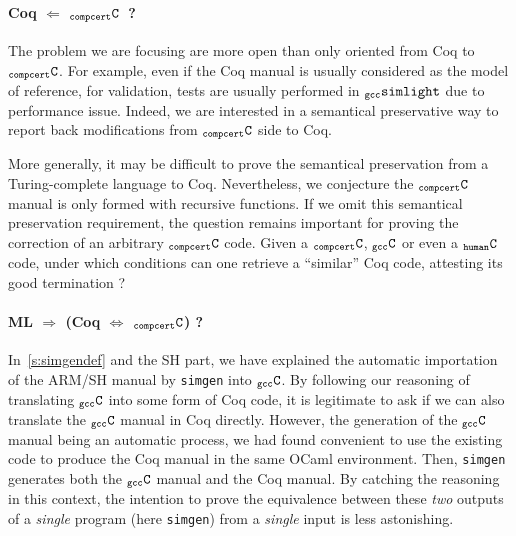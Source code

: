 \documentclass[a4paper, 11pt]{article}
\newcommand{\gccSL}{$_{\tt gcc}{\tt simlight}$\xspace}
\newcommand{\simgen}{{\tt simgen}\xspace}
\newcommand{\C}{$_{\tt compcert}{\tt C}$\xspace}
\newcommand{\gccC}{$_{\tt gcc}{\tt C}$\xspace}
\newcommand{\hC}{$_{\tt human}{\tt C}$\xspace}
\begin{document}
\paragraph{Coq $\Longleftarrow$ \C~?}
The problem we are focusing are more open than only oriented from Coq to \C. For example, even if the Coq manual is usually considered as the model of reference, for validation, tests are usually performed in \gccSL due to performance issue. Indeed, we are interested in a semantical preservative way to report back modifications from \C side to Coq. 

More generally, it may be difficult to prove the semantical preservation from a Turing-complete language to Coq. Nevertheless, we conjecture the \C manual is only formed with recursive functions. If we omit this semantical preservation requirement, the question remains important for proving the correction of an arbitrary \C code. Given a \C, \gccC or even a \hC code, under which conditions can one retrieve a ``similar'' Coq code, attesting its good termination ? 

\paragraph{ML $\Longrightarrow$ (Coq $\Longleftrightarrow$ \C) ?}

In~\ref{s:simgendef} and the SH part, we have explained the automatic importation of the ARM/SH manual by \simgen into \gccC. By following our reasoning of translating \gccC into some form of Coq code, it is legitimate to ask if we can also translate the \gccC manual in Coq directly. However, the generation of the \gccC manual being an automatic process, we had found convenient to use the existing code to produce the Coq manual in the same OCaml environment. Then, \simgen generates both the \gccC manual and the Coq manual. By catching the reasoning in this context, the intention to prove the equivalence between these \emph{two} outputs of a \emph{single} program (here \simgen) from a \emph{single} input is less astonishing. 
\end{document}
